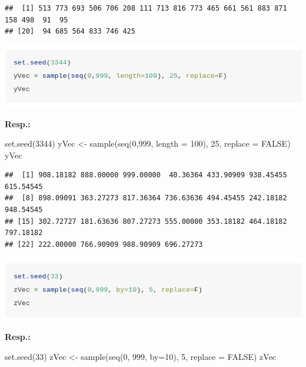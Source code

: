 \documentclass[
]{article}
\newenvironment{Shaded}{\begin{snugshade}}{\end{snugshade}}
\newcommand{\AttributeTok}[1]{\textcolor[rgb]{0.77,0.63,0.00}{#1}}
\newcommand{\ConstantTok}[1]{\textcolor[rgb]{0.00,0.00,0.00}{#1}}
\newcommand{\DecValTok}[1]{\textcolor[rgb]{0.00,0.00,0.81}{#1}}
\newcommand{\FunctionTok}[1]{\textcolor[rgb]{0.00,0.00,0.00}{#1}}
\newcommand{\NormalTok}[1]{#1}
\newcommand{\OtherTok}[1]{\textcolor[rgb]{0.56,0.35,0.01}{#1}}
\begin{document}
\begin{verbatim}
##  [1] 513 773 693 506 706 208 111 713 816 773 465 661 561 883 871 158 498  91  95
## [20]  94 685 564 833 746 425
\end{verbatim}

\begin{center}\includegraphics[width=0.8\linewidth,]{img/lab1-exerc2-2-2} \end{center}

\textbf{Resp.:}

\begin{Shaded}
\begin{Highlighting}[]
\FunctionTok{set.seed}\NormalTok{(}\DecValTok{3344}\NormalTok{)}
\NormalTok{yVec }\OtherTok{\textless{}{-}}  \FunctionTok{sample}\NormalTok{(}\FunctionTok{seq}\NormalTok{(}\DecValTok{0}\NormalTok{,}\DecValTok{999}\NormalTok{, }\AttributeTok{length =} \DecValTok{100}\NormalTok{), }\DecValTok{25}\NormalTok{, }\AttributeTok{replace =} \ConstantTok{FALSE}\NormalTok{)}
\NormalTok{yVec}
\end{Highlighting}
\end{Shaded}

\begin{verbatim}
##  [1] 908.18182 888.00000 999.00000  40.36364 433.90909 938.45455 615.54545
##  [8] 898.09091 363.27273 817.36364 736.63636 494.45455 242.18182 948.54545
## [15] 302.72727 181.63636 807.27273 555.00000 353.18182 464.18182 797.18182
## [22] 222.00000 766.90909 988.90909 696.27273
\end{verbatim}

\begin{center}\includegraphics[width=0.8\linewidth,]{img/lab1-exerc2-2-3} \end{center}

\textbf{Resp.:}

\begin{Shaded}
\begin{Highlighting}[]
\FunctionTok{set.seed}\NormalTok{(}\DecValTok{33}\NormalTok{)}
\NormalTok{zVec }\OtherTok{\textless{}{-}}  \FunctionTok{sample}\NormalTok{(}\FunctionTok{seq}\NormalTok{(}\DecValTok{0}\NormalTok{, }\DecValTok{999}\NormalTok{, }\AttributeTok{by=}\DecValTok{10}\NormalTok{), }\DecValTok{5}\NormalTok{, }\AttributeTok{replace =} \ConstantTok{FALSE}\NormalTok{)}
\NormalTok{zVec}
\end{Highlighting}
\end{Shaded}
\end{document}
